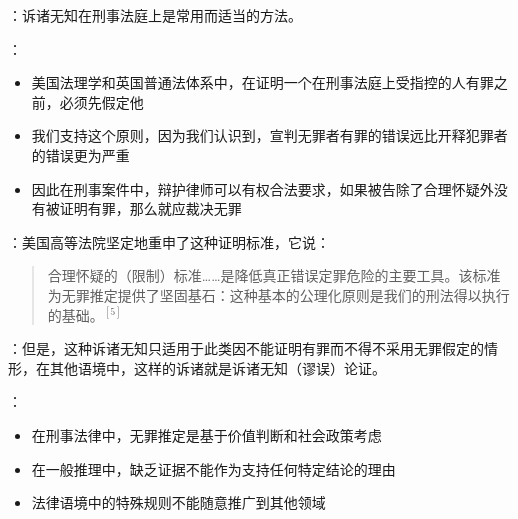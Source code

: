 \begin{examplebox}[title=法律中的合理应用]
：诉诸无知在刑事法庭上是常用而适当的方法。

：
\begin{itemize}
  \item 美国法理学和英国普通法体系中，在证明一个在刑事法庭上受指控的人有罪之前，必须先假定他
  \item 我们支持这个原则，因为我们认识到，宣判无罪者有罪的错误远比开释犯罪者的错误更为严重
  \item 因此在刑事案件中，辩护律师可以有权合法要求，如果被告除了合理怀疑外没有被证明有罪，那么就应裁决无罪
\end{itemize}

：美国高等法院坚定地重申了这种证明标准，它说：

\begin{quote}
合理怀疑的（限制）标准……是降低真正错误定罪危险的主要工具。该标准为无罪推定提供了坚固基石：这种基本的公理化原则是我们的刑法得以执行的基础。$^{[5]}$
\end{quote}

：但是，这种诉诸无知只适用于此类因不能证明有罪而不得不采用无罪假定的情形，在其他语境中，这样的诉诸就是诉诸无知（谬误）论证。

：
\begin{itemize}
  \item 在刑事法律中，无罪推定是基于价值判断和社会政策考虑
  \item 在一般推理中，缺乏证据不能作为支持任何特定结论的理由
  \item 法律语境中的特殊规则不能随意推广到其他领域
\end{itemize}
\end{examplebox}